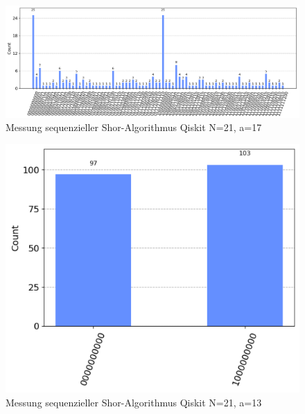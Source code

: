 \documentclass[lettersize,journal]{IEEEtran}
\begin{document}
\clearpage
\begin{figure}[p]
\caption{Messung sequenzieller Shor-Algorithmus Qiskit N=21, a=17}
\label{fig:shor_countsN21a17}
\includegraphics[height=\linewidth,angle=90]{shor_countsN21a17.PNG}
\end{figure}
\begin{figure}[p]
\caption{Messung sequenzieller Shor-Algorithmus Qiskit N=21, a=13}
\label{fig:shor_countsN21a13}
\includegraphics[height=\linewidth,angle=90]{shor_countsN21a13.PNG}
\end{figure}
\clearpage


\end{document}
